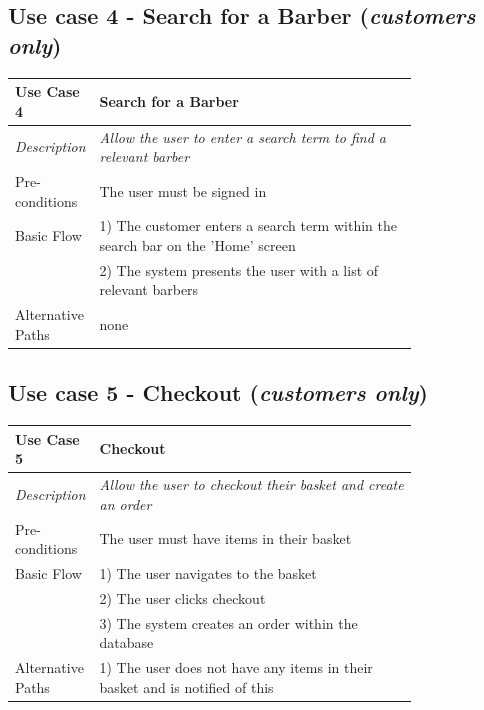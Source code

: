\documentclass[12pt]{article}
\begin{document}
	\subsection{Use case 4 - Search for a Barber (\emph{customers only})}
	\label{chap:use-cases-4}
	\begin{table}[H]
		\begin{tabular}{|l|p{0.8\linewidth}}
			\hline
			\rowcolor[HTML]{EFEFEF} 
			\textbf{Use Case 4}  & \textbf{Search for a Barber}                                                         \\ \hline
			\rowcolor[HTML]{F5FBFF} 
			\textit{Description} & \textit{Allow the user to enter a search term to find a relevant barber}                                  \\ \hline
			\rowcolor[HTML]{EFEFEF} 
			Pre-conditions       & The user must be signed in                                                      \\ \hline
			\rowcolor[HTML]{F5FBFF} 
			Basic Flow           & 1) The customer enters a search term within the search bar on the 'Home' screen \\
			\rowcolor[HTML]{F5FBFF} 
			& 2) The system presents the user with a list of relevant barbers                 \\ \hline
			\rowcolor[HTML]{EFEFEF} 
			Alternative Paths    & none                                                                           
		\end{tabular}
	\end{table}

	\subsection{Use case 5 - Checkout (\emph{customers only})}
	\label{chap:use-cases-5}
	\begin{table}[H]
		\begin{tabular}{|l|p{0.8\linewidth}}
			\hline
			\rowcolor[HTML]{EFEFEF} 
			\textbf{Use Case 5}  & \textbf{Checkout}                                                           \\ \hline
			\rowcolor[HTML]{F5FBFF} 
			\textit{Description} & \textit{Allow the user to checkout their basket and create an order}        \\ \hline
			\rowcolor[HTML]{EFEFEF} 
			Pre-conditions       & The user must have items in their basket                                    \\ \hline
			\rowcolor[HTML]{F5FBFF} 
			Basic Flow           & 1) The user navigates to the basket                 \\
			\rowcolor[HTML]{F5FBFF} 
			& 2) The user clicks checkout     \\
			\rowcolor[HTML]{F5FBFF} 
			& 3) The system creates an order within the database                                                 \\ \hline
			\rowcolor[HTML]{EFEFEF} 
			Alternative Paths    & 1) The user does not have any items in their basket and is notified of this
		\end{tabular}
	\end{table}
	
\end{document}
